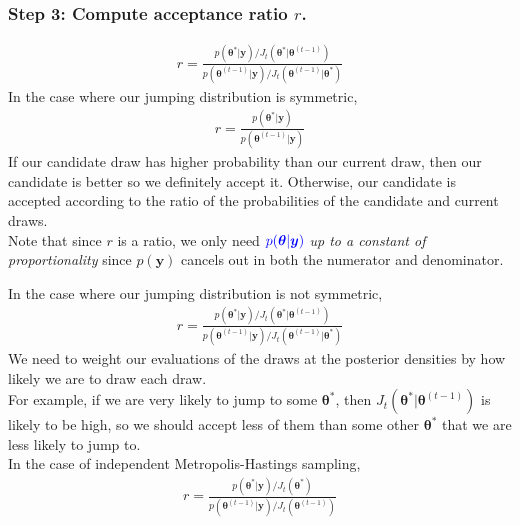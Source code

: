 \documentclass{beamer}
\begin{document}
\begin{frame}
\frametitle{Step 3: Compute acceptance ratio $r$.}
\pause
\begin{eqnarray*}
r = \frac{p(\bm{\theta}^* | \bm{y})/J_t(\bm{\theta}^* | \bm{\theta}^{(t-1)})}{p(\bm{\theta}^{(t-1)} | \bm{y})/J_t(\bm{\theta}^{(t-1)} | \bm{\theta}^*)}
\end{eqnarray*}
\pause
In the case where our jumping distribution is symmetric,
\begin{eqnarray*}
r = \frac{p(\bm{\theta}^* | \bm{y})}{p(\bm{\theta}^{(t-1)} | \bm{y})}
\end{eqnarray*}
\pause
If our candidate draw has higher probability than our current draw,
then our candidate is better so we definitely accept it.  \pause
Otherwise, our candidate is accepted according to the ratio of the
probabilities of the candidate and current draws. \\
\bigskip
\pause
Note that since $r$ is a ratio, we only need $\textcolor{blue}{p(\bm{\theta} |
\bm{y})}$ \textit{up to a constant of proportionality} since
$p(\bm{y})$ cancels out in both the numerator and denominator.
\end{frame}

\begin{frame}
In the case where our jumping distribution is not symmetric,
\begin{eqnarray*}
r = \frac{p(\bm{\theta}^* | \bm{y})/J_t(\bm{\theta}^* | \bm{\theta}^{(t-1)})}{p(\bm{\theta}^{(t-1)} | \bm{y})/J_t(\bm{\theta}^{(t-1)} | \bm{\theta}^*)}
\end{eqnarray*}
\pause
We need to weight our evaluations of the draws at the posterior
densities by how likely we are to draw each draw.  \\
\bigskip
\pause
For example, if we are very likely to jump to some $\bm{\theta}^*$,
then $J_t(\bm{\theta}^* | \bm{\theta}^{(t-1)})$ is likely to be high,
so we should accept less of them than some other $\bm{\theta}^*$ that
we are less likely to jump to.\\
\pause
\bigskip
In the case of independent Metropolis-Hastings sampling,
\begin{eqnarray*}
r = \frac{p(\bm{\theta}^* | \bm{y})/J_t(\bm{\theta}^*)}{p(\bm{\theta}^{(t-1)} | \bm{y})/J_t(\bm{\theta}^{(t-1)})}
\end{eqnarray*}

\end{frame}
\end{document}
